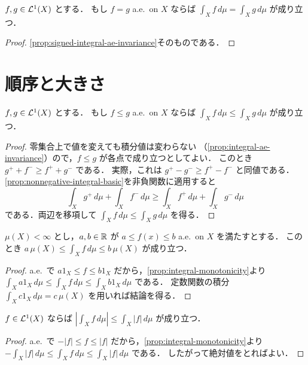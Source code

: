 \begin{proposition}[a.e.\ 不変性]\label{prop:integral-ae-invariance}
$f,g\in\mathcal L^1(X)$ とする．
もし $f=g$ a.e.\ on $X$ ならば $\int_X f\,d\mu=\int_X g\,d\mu$ が成り立つ．
\end{proposition}
\begin{proof}
\cref{prop:signed-integral-ae-invariance}そのものである．
\end{proof}

\section{順序と大きさ}

\begin{proposition}[単調性]\label{prop:integral-monotonicity}
$f,g\in\mathcal L^1(X)$ とする．
もし $f\le g$ a.e.\ on $X$ ならば $\int_X f\,d\mu\le \int_X g\,d\mu$ が成り立つ．
\end{proposition}
\begin{proof}
零集合上で値を変えても積分値は変わらない
（\cref{prop:integral-ae-invariance}）ので，$f\le g$ が各点で成り立つとしてよい．
このとき $g^+ + f^- \ge f^+ + g^-$ である．
実際，これは $g^+-g^- \ge f^+-f^-$ と同値である．
\cref{prop:nonnegative-integral-basic}を非負関数に適用すると
\[
\int_X g^+\,d\mu+\int_X f^-\,d\mu
\ge
\int_X f^+\,d\mu+\int_X g^-\,d\mu
\]
である．両辺を移項して $\int_X f\,d\mu\le \int_X g\,d\mu$ を得る．
\end{proof}

\begin{proposition}[定数による評価]\label{prop:integral-bound-by-constants}
$\mu(X)<\infty$ とし，$a,b \in \mathbb R$ が $a\le f(x)\le b$ a.e.\ on $X$ を満たすとする．
このとき $a\,\mu(X)\le \int_X f\,d\mu\le b\,\mu(X)$ が成り立つ．
\end{proposition}
\begin{proof}
a.e.\ で $a1_X\le f\le b1_X$ だから，\cref{prop:integral-monotonicity}より
$\int_X a1_X\,d\mu\le \int_X f\,d\mu\le \int_X b1_X\,d\mu$ である．
定数関数の積分 $\int_X c1_X\,d\mu=c\,\mu(X)$ を用いれば結論を得る．
\end{proof}

\begin{proposition}[絶対値による評価]\label{prop:integral-absolute-value-bound}
$f\in\mathcal L^1(X)$ ならば
$\left|\int_X f\,d\mu\right|\le \int_X |f|\,d\mu$ が成り立つ．
\end{proposition}
\begin{proof}
a.e.\ で $-|f|\le f\le |f|$ だから，\cref{prop:integral-monotonicity}より
$-\int_X |f|\,d\mu\le \int_X f\,d\mu\le \int_X |f|\,d\mu$ である．
したがって絶対値をとればよい．
\end{proof}


